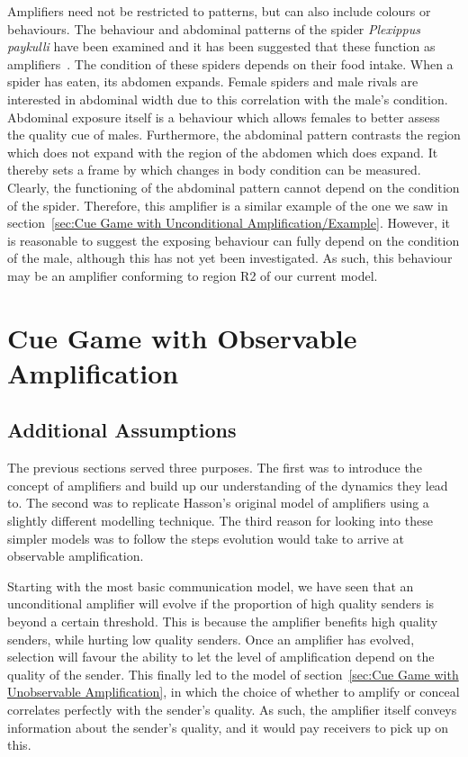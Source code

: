 \documentclass[a4paper,12pt]{article}
\numberwithin{equation}{section}
\begin{document}
Amplifiers need not be restricted to patterns, but can also include colours or behaviours. The behaviour and abdominal patterns of the spider \textit{Plexippus paykulli} have been examined and it has been suggested that these function as amplifiers~\cite{Taylor2000}. The condition of these spiders depends on their food intake. When a spider has eaten, its abdomen expands. Female spiders and male rivals are interested in abdominal width due to this correlation with the male's condition. Abdominal exposure itself is a behaviour which allows females to better assess the quality cue of males. Furthermore, the abdominal pattern contrasts the region which does not expand with the region of the abdomen which does expand. It thereby sets a frame by which changes in body condition can be measured. Clearly, the functioning of the abdominal pattern cannot depend on the condition of the spider. Therefore, this amplifier is a similar example of the one we saw in section~\ref{sec:Cue Game with Unconditional Amplification/Example}. However, it is reasonable to suggest the exposing behaviour can fully depend on the condition of the male, although this has not yet been investigated. As such, this behaviour may be an amplifier conforming to region R2 of our current model.

\newpage\clearpage


\section{Cue Game with Observable Amplification}
\label{sec:Cue Game with Observable Amplification}
\subsection{Additional Assumptions}
\label{sec:Cue Game with Observable Amplification/Additional Assumptions}

The previous sections served three purposes. The first was to introduce the concept of amplifiers and build up our understanding of the dynamics they lead to. The second was to replicate Hasson's original model of amplifiers using a slightly different modelling technique. The third reason for looking into these simpler models was to follow the steps evolution would take to arrive at observable amplification.

Starting with the most basic communication model, we have seen that an unconditional amplifier will evolve if the proportion of high quality senders is beyond a certain threshold. This is because the amplifier benefits high quality senders, while hurting low quality senders. Once an amplifier has evolved, selection will favour the ability to let the level of amplification depend on the quality of the sender. This finally led to the model of section~\ref{sec:Cue Game with Unobservable Amplification}, in which the choice of whether to amplify or conceal correlates perfectly with the sender's quality. As such, the amplifier itself conveys information about the sender's quality, and it would pay receivers to pick up on this.
\end{document}
